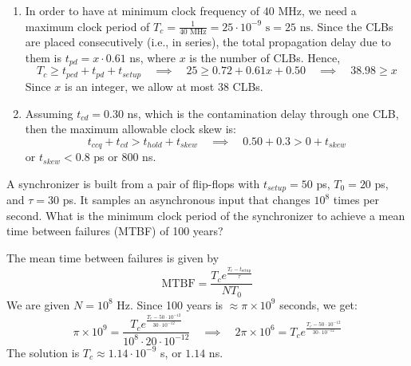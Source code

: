 \documentclass[12pt]{article}
\newenvironment{ex}[2][Exercise]{\begin{trivlist}
		\item[\hskip \labelsep {\bfseries #1}\hskip \labelsep {\bfseries #2.}]}{\end{trivlist}}
\newenvironment{sol}[1][Solution]{\begin{trivlist}
		\item[\hskip \labelsep {\bfseries #1:}]}{\end{trivlist}}
\begin{document}
\begin{sol}
	\begin{enumerate}[label=(\alph*)]
		\item In order to have at minimum clock frequency of 40 MHz, we need a maximum
		clock period of $T_{c}=\frac{1}{40\text{ MHz}}=25\cdot 10^{-9}\text { s}=25\text{ ns}$.
		Since the CLBs are placed consecutively (i.e., in series), the total
		propagation delay due to them is $t_{pd}=x\cdot 0.61$ ns, where $x$ is the number
		of CLBs. Hence,
		\[
		T_{c} \geq t_{pcd}+t_{pd}+t_{setup}\quad\implies\quad 25\geq0.72+0.61x+0.50\quad\implies\quad
		38.98\geq x
		\]
		Since $x$ is an integer, we allow at most 38 CLBs.
		\item Assuming $t_{cd}=0.30$ ns, which is the contamination delay through
		one CLB, then the maximum allowable clock skew is:
		\[
		t_{ccq}+t_{cd}> t_{hold}+t_{skew}\quad\implies\quad 0.50+0.3>0+t_{skew}
		\]
		or $t_{skew}<0.8$ ps or $800$ ns.
	\end{enumerate}
\end{sol}

\begin{ex}{3.36}
	A synchronizer is built from a pair of flip-flops with $t_{setup}=50$ ps,  $T_0=20$ ps,
	and $\tau=30$ ps. It samples an asynchronous input that changes $10^8$ times per second.
	What is the minimum clock period of the synchronizer to achieve a mean time between
	failures (MTBF) of 100 years?
\end{ex}

\begin{sol}
	The mean time between failures is given by
	\[
	\text{MTBF}=\frac{T_ce^{\frac{T_c-t_{\text{setup}}}{\tau}}}{NT_0}
	\]
	We are given $N=10^8$ Hz.  Since 100 years is $\approx \pi\times 10^{9}$ seconds, we get:
	\[
	\pi\times 10^{9}=\frac{T_ce^{\frac{T_c-50\cdot 10^{-12}}{30\cdot 10^{-12}}}}{10^{8}\cdot 20\cdot 10^{-12}}\quad\implies\quad
	2\pi\times 10^{6}=T_ce^{\frac{T_c-50\cdot 10^{-12}}{30\cdot 10^{-12}}}
	\]
	The solution is $T_c\approx 1.14\cdot 10^{-9}$ s, or $1.14$ ns.
\end{sol}
\end{document}
